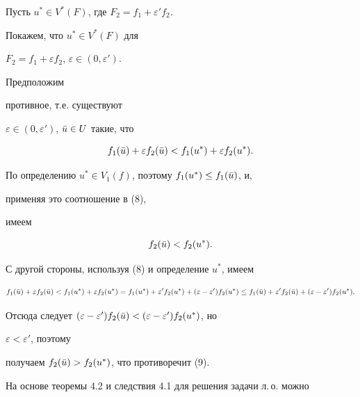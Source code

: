 \begin{pf}


Пусть $u^*\in V^*(F)$, где $F_2=f_1+\varepsilon'f_2$.


Покажем, что $u^*\in V^*(F)$ для


$F_2=f_1+\varepsilon f_2$, $\varepsilon\in(0,\varepsilon')$.


Предположим


противное, т.е. существуют


$\varepsilon\in(0,\varepsilon')$, $\Bar u\in U$ такие, что


\begin{equation}


f_1(\Bar u)+\varepsilon f_2(\Bar u)<f_1(u^*)+


\varepsilon f_2(u^*).


\end{equation}


По определению $u^*\in V_1(f)$, поэтому $f_1(u^*)\le f_1(\Bar u)$, и,


применяя это соотношение в (8),


имеем


\begin{equation}


f_2(\Bar u)<f_2(u^*).


\end{equation}


С другой стороны, используя (8) и определение $u^*$, имеем


$$


f_1(\Bar u)+\varepsilon f_2(\Bar u)<f_1(u^*)+


\varepsilon f_2(u^*)=f_1(u^*)+\varepsilon'f_2(u^*)+


(\varepsilon-\varepsilon')f_2(u^*)\le


f_1(\Bar u)+\varepsilon'f_2(\Bar u)+(\varepsilon-\varepsilon')


f_2(u^*).


$$


Отсюда следует $(\varepsilon-\varepsilon')f_2(\Bar u)<


(\varepsilon-\varepsilon')f_2(u^*)$, но


$\varepsilon<\varepsilon'$, поэтому


получаем $f_2(\Bar u)>f_2(u^*)$, что противоречит (9).


\end{pf}





На основе теоремы 4.2 и следствия 4.1 для решения задачи л.\,о. можно


